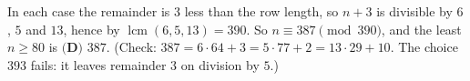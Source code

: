 In each case the remainder is $3$ less than the row length, so $n+3$ is divisible by $6$, $5$ and $13$, hence by $\operatorname{lcm}(6,5,13)=390$. So $n\equiv387\pmod{390}$, and the least $n\ge80$ is $\boxed{\textbf{(D) }387}$. (Check: $387=6\cdot64+3=5\cdot77+2=13\cdot29+10$. The choice $393$ fails: it leaves remainder $3$ on division by $5$.)
